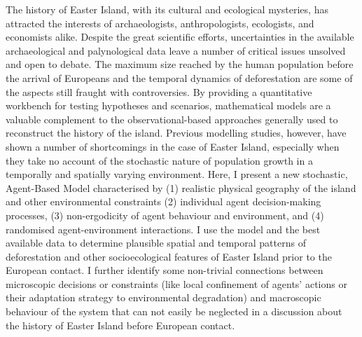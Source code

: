 
The history of Easter Island, with its cultural and ecological mysteries, has attracted the interests of archaeologists, anthropologists, ecologists, and econo\-mists alike. Despite the great scientific efforts, uncertainties in the available archaeological and palynological data leave a number of critical issues unsolved and open to debate. The maximum size reached by the human population before the arrival of Europeans and the temporal dynamics of deforestation are some of the aspects still fraught with controversies. By providing a quantitative workbench for testing hypotheses and scenarios, mathematical models are a valuable complement to the observational-based approaches generally used to reconstruct the history of the island. Previous modelling studies, however, have shown a number of shortcomings in the case of Easter Island, especially when they take no account of the stochastic nature of population growth in a temporally and spatially varying environment. Here, I present a new stochastic, Agent-Based Model characterised by (1) realistic physical geography of the island and other environmental constraints (2) individual agent decision-making processes, (3) non-ergodicity of agent behaviour and environment, and (4) randomised agent-environment interactions. I use the model and the best available data to determine plausible spatial and temporal patterns of deforestation and other socioecological features of Easter Island prior to the European contact. %
I further identify some non-trivial connections between microscopic decisions or constraints (like local confinement of agents' actions or their adaptation strategy to environmental degradation) and macroscopic behaviour of the system that can not easily be neglected in a discussion about the history of Easter Island before European contact.